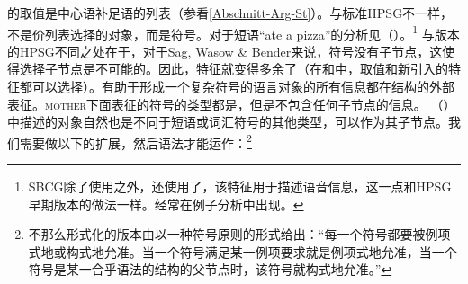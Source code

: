 \noindent
\comps{}的取值是中心语补足语的列表（参看\ref{Abschnitt-Arg-St}）。与标准HPSG\indexhpsgc 不一样，不是价列表选择的对象，而是符号。对于短语“ate a pizza”的分析见（）。\footnote{
  SBCG除了使用\phonfc 之外，还使用了\formfc，该特征用于描述语音信息，这一点和HPSG早期版本的做法一样\citep[\S~3.1, \S~3.6]{Sag2012a}。\formfc 经常在例子分析中出现。
}
\ea
\label{feat-geom-swb}
\z
\largerpage
与\citet{ps2}版本的HPSG不同之处在于，对于Sag, Wasow \& Bender来说，符号没有子节点，这使得选择子节点是不可能的。因此，\synsemf{}特征就变得多余了（在和中，\phonvc 取值和新引入的\formfc 特征都可以选择）。有助于形成一个复杂符号的语言对象的所有信息都在结构的外部表征。\textsc{mother}下面表征的符号的类型都是，但是不包含任何子节点的信息。 （）中描述的对象自然也是不同于短语或词汇符号的其他类型，可以作为其子节点。我们需要做以下的扩展，然后语法才能运作\citep*[]{SWB2003a}：\footnote{
不那么形式化的版本由\citet[]{Sag2012a}以一种符号原则的形式给出：“每一个符号都要被例项式地或构式地允准。当一个符号满足某一例项要求就是例项式地允准，当一个符号是某一合乎语法的结构的父节点时，该符号就构式地允准。” 
}

